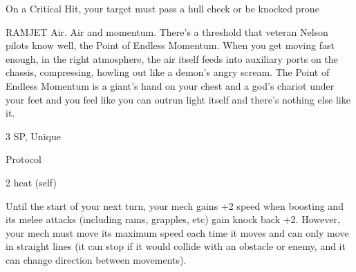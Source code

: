 On a Critical Hit, your target must pass a hull check or be knocked prone
 

RAMJET  
Air. Air and momentum. There’s a threshold that veteran Nelson pilots know well, the Point of Endless  
Momentum. When you get moving fast enough, in the right atmosphere, the air itself feeds into auxiliary  
ports on the chassis, compressing, howling out like a demon’s angry scream. The Point of Endless  
Momentum is a giant’s hand on your chest and a god’s chariot under your feet and you feel like you can  
outrun light itself and there’s nothing else like it.  

3 SP, Unique
 
Protocol
 
2 heat (self)
 
Until the start of your next turn, your mech gains +2 speed when boosting and its melee attacks  
(including rams, grapples, etc) gain knock back +2. However, your mech must move its  
maximum speed each time it moves and can only move in straight lines (it can stop if it would  
collide with an obstacle or enemy, and it can change direction between movements).
 
